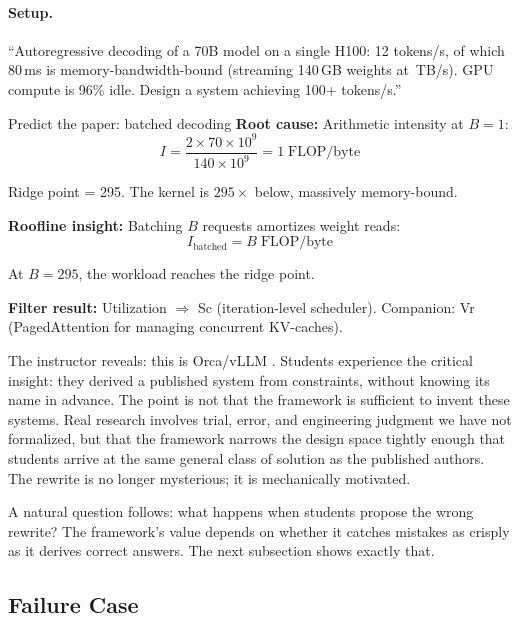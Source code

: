 \documentclass[10pt,twocolumn]{article}
\newcommand{\cval}[1]{\pgfmathprintnumber[fixed, precision=1, 1000 sep={\,}]{#1}}
\begin{document}
\paragraph{Setup.} ``Autoregressive decoding of a 70B model on a single H100: 12 tokens/s, of which 80\,ms is memory-bandwidth-bound (streaming 140\,GB weights at \cval{\HhBWTBs}\,TB/s). GPU compute is 96\% idle. Design a system achieving 100+ tokens/s.''

\begin{napkinmath}{Predict the paper: batched decoding}
\textbf{Root cause:} Arithmetic intensity at $B = 1$:
\[
I = \frac{2 \times 70 \times 10^9}{140 \times 10^9} = 1\;\text{FLOP/byte}
\]

Ridge point = 295. The kernel is $295\times$ below, massively memory-bound.

\textbf{Roofline insight:} Batching $B$ requests amortizes weight reads:
\[
I_{\text{batched}} = B \;\text{FLOP/byte}
\]

At $B = 295$, the workload reaches the ridge point.

\textbf{Filter result:} Utilization $\Rightarrow$ Sc (iteration-level scheduler). Companion: Vr (PagedAttention for managing concurrent KV-caches).
\end{napkinmath}

The instructor reveals: this is Orca/vLLM \citep{yu2022orca, kwon2023}. Students experience the critical insight: they derived a published system from constraints, without knowing its name in advance. The point is not that the framework is sufficient to invent these systems. Real research involves trial, error, and engineering judgment we have not formalized, but that the framework narrows the design space tightly enough that students arrive at the same general class of solution as the published authors. The rewrite is no longer mysterious; it is mechanically motivated.

A natural question follows: what happens when students propose the wrong rewrite? The framework's value depends on whether it catches mistakes as crisply as it derives correct answers. The next subsection shows exactly that.

\subsection{Failure Case}
\label{sec:failure-case}
\end{document}
